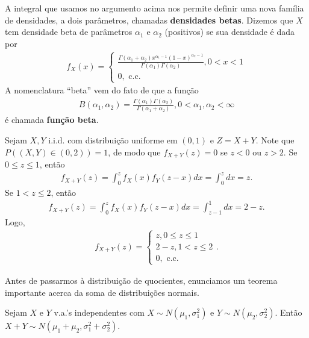 \documentclass[../Notas.tex]{subfiles}
\begin{document}
\begin{example}
A integral que usamos no argumento acima nos permite definir uma nova família de densidades, a dois parâmetros, chamadas \textbf{densidades betas}. Dizemos que $X$ tem densidade beta de parâmetros $\alpha_1$ e $\alpha_2$ (positivos) se sua densidade é dada por
\begin{align*}
    f_X(x) = \begin{cases}
    \frac{ \Gamma(\alpha_1+\alpha_2)x^{\alpha_1 - 1}(1-x)^{\alpha_2 - 1} }{ \Gamma(\alpha_1)\Gamma(\alpha_2) }, 0 < x < 1 \\
    0, \text{ c.c.}
    \end{cases}
\end{align*}
A nomenclatura ``beta'' vem do fato de que a função
\begin{align*}
    B(\alpha_1, \alpha_2) = \frac{ \Gamma(\alpha_1)\Gamma(\alpha_2) }{\Gamma(\alpha_1+\alpha_2)}, 0 < \alpha_1, \alpha_2 < \infty
\end{align*}
é chamada \textbf{função beta}.
\end{example}

\begin{example}
Sejam $X,Y$ i.i.d. com distribuição uniforme em $(0,1)$ e $Z=X+Y$. Note que $P((X,Y)\in (0,2)) = 1$, de modo que $f_{X+Y}(z) = 0$ se $z<0$ ou $z>2$. Se $0\leq z\leq 1$, então
\begin{align*}
    f_{X+Y}(z) = \int_0^z f_X(x)f_Y(z-x) dx = \int_0^z dx = z.
\end{align*}
Se $1 < z \leq 2$, então
\begin{align*}
    f_{X+Y}(z) = \int_0^z f_X(x)f_Y(z-x) dx = \int_{z-1}^{1} dx = 2 - z.
\end{align*}
Logo,
\begin{align*}
    f_{X+Y}(z) = \begin{cases}
    z, 0\leq z \leq 1 \\
    2-z, 1 < z \leq 2 \\
    0, \text{ c.c.}
    \end{cases}.
\end{align*}
\end{example}

Antes de passarmos à distribuição de quocientes, enunciamos um teorema importante acerca da soma de distribuições normais.

\begin{theorem}
Sejam $X$ e $Y$ v.a.'s independentes com $X\sim N(\mu_1, \sigma_1^2)$ e $Y\sim N(\mu_2, \sigma_2^2)$. Então $X+Y\sim N(\mu_1+\mu_2, \sigma_1^2 + \sigma_2^2)$.
\end{theorem}
\end{document}
